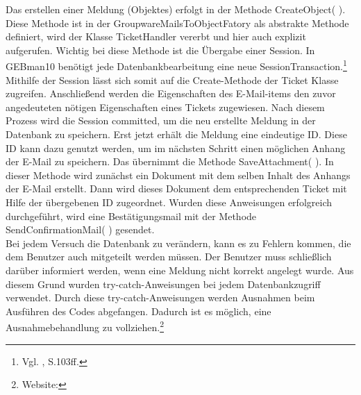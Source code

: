 \noindent
Das erstellen einer Meldung (Objektes) erfolgt in der Methode CreateObject( ). Diese Methode ist in der GroupwareMailsToObjectFatory als abstrakte Methode definiert, wird der Klasse TicketHandler vererbt und hier auch explizit aufgerufen. Wichtig bei diese Methode ist die Übergabe einer Session. In GEBman10 benötigt jede Datenbankbearbeitung eine neue SessionTransaction.\footnote{Vgl. \citeauthor{Fowler} \citeyear{Fowler}, S.103ff.} 
Mithilfe der Session lässt sich somit auf die Create-Methode der Ticket Klasse zugreifen. Anschließend werden die Eigenschaften des E-Mail-items den zuvor angedeuteten nötigen Eigenschaften eines Tickets zugewiesen. Nach diesem Prozess wird die Session committed, um die neu erstellte Meldung in der Datenbank zu speichern. Erst jetzt erhält die Meldung eine eindeutige ID. Diese ID kann dazu genutzt werden, um im nächsten Schritt einen möglichen Anhang der E-Mail zu speichern. Das übernimmt die Methode SaveAttachment( ). In dieser Methode wird zunächst ein Dokument mit dem selben Inhalt des Anhangs der E-Mail erstellt. Dann wird dieses Dokument dem entsprechenden Ticket mit Hilfe der übergebenen ID zugeordnet. Wurden diese Anweisungen erfolgreich durchgeführt, wird eine Bestätigungsmail mit der Methode SendConfirmationMail( ) gesendet.\\

\noindent
Bei jedem Versuch die Datenbank zu verändern, kann es zu Fehlern kommen, die dem Benutzer auch mitgeteilt werden müssen. Der Benutzer muss schließlich darüber informiert werden, wenn eine Meldung nicht korrekt angelegt wurde. Aus diesem Grund wurden try-catch-Anweisungen bei jedem Datenbankzugriff verwendet. Durch diese try-catch-Anweisungen werden Ausnahmen beim Ausführen des Codes abgefangen. Dadurch ist es möglich, eine Ausnahmebehandlung zu vollziehen.\footnote{Website:\cite{TryCatch}}


